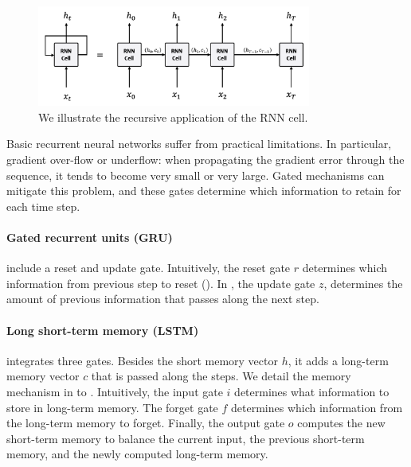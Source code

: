 \begin{figure}[!ht]
	\includegraphics[width=9cm]{images/rnn_cell_unfold.png}
	\caption[RNN cell unfold]{We illustrate the recursive application of the RNN cell.}
\end{figure}

Basic recurrent neural networks suffer from practical limitations. In particular, gradient over-flow or underflow: when propagating the gradient error through the sequence, it tends to become very small or very large. Gated mechanisms can mitigate this problem, and these gates determine which information to retain for each time step.


\paragraph{Gated recurrent units (GRU)} include a reset and update gate. Intuitively, the reset gate $r$ determines which information from previous step to reset (). In , the update gate $z$, determines the amount of previous information that passes along the next step.


\paragraph{Long short-term memory (LSTM)} integrates three gates. Besides the short memory vector $h$, it adds a long-term memory vector $c$ that is passed along the steps. We detail the memory mechanism in  to . Intuitively, the input gate $i$ determines what information to store in long-term memory. The forget gate $f$ determines which information from the long-term memory to forget. Finally, the output gate $o$ computes the new short-term memory to balance the current input, the previous short-term memory, and the newly computed long-term memory.

